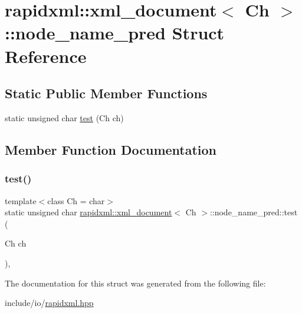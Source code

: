 \hypertarget{structrapidxml_1_1xml__document_1_1node__name__pred}{}\section{rapidxml\+::xml\+\_\+document$<$ Ch $>$\+::node\+\_\+name\+\_\+pred Struct Reference}
\label{structrapidxml_1_1xml__document_1_1node__name__pred}
\subsection*{Static Public Member Functions}
\begin{DoxyCompactItemize}
\item 
static unsigned char \mbox{\hyperlink{structrapidxml_1_1xml__document_1_1node__name__pred_a4eb7916489a3d057a340ce84e9135aec}{test}} (Ch ch)
\end{DoxyCompactItemize}


\subsection{Member Function Documentation}
\mbox{\label{structrapidxml_1_1xml__document_1_1node__name__pred_a4eb7916489a3d057a340ce84e9135aec}} 
\subsubsection{\texorpdfstring{test()}{test()}}
{\footnotesize\ttfamily template$<$class Ch = char$>$ \\
static unsigned char \mbox{\hyperlink{classrapidxml_1_1xml__document}{rapidxml\+::xml\+\_\+document}}$<$ Ch $>$\+::node\+\_\+name\+\_\+pred\+::test (\begin{DoxyParamCaption}\item[{Ch}]{ch }\end{DoxyParamCaption})\hspace{0.3cm}{\ttfamily [inline]}, {\ttfamily [static]}}



The documentation for this struct was generated from the following file\+:\begin{DoxyCompactItemize}
\item 
include/io/\mbox{\hyperlink{rapidxml_8hpp}{rapidxml.\+hpp}}\end{DoxyCompactItemize}
